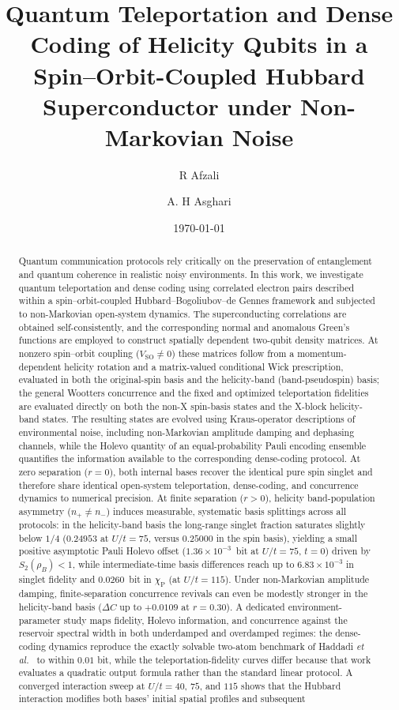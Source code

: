 \documentclass[aps,prb,twocolumn,superscriptaddress,longbibliography]{revtex4-2}
\begin{document}
\title{Quantum Teleportation and Dense Coding of Helicity Qubits in a Spin--Orbit-Coupled Hubbard Superconductor under Non-Markovian Noise}

\author{R Afzali}
\author{A. H Asghari}


\date{\today}

\begin{abstract}
Quantum communication protocols rely critically on the preservation of entanglement and quantum coherence in realistic noisy environments. In this work, we investigate quantum teleportation and dense coding using correlated electron pairs described within a spin--orbit-coupled Hubbard--Bogoliubov--de Gennes framework and subjected to non-Markovian open-system dynamics. The superconducting correlations are obtained self-consistently, and the corresponding normal and anomalous Green's functions are employed to construct spatially dependent two-qubit density matrices. At nonzero spin--orbit coupling ($V_{\mathrm{SO}}\neq0$) these matrices follow from a momentum-dependent helicity rotation and a matrix-valued conditional Wick prescription, evaluated in both the original-spin basis and the helicity-band (band-pseudospin) basis; the general Wootters concurrence and the fixed and optimized teleportation fidelities are evaluated directly on both the non-X spin-basis states and the X-block helicity-band states. The resulting states are evolved using Kraus-operator descriptions of environmental noise, including non-Markovian amplitude damping and dephasing channels, while the Holevo quantity of an equal-probability Pauli encoding ensemble quantifies the information available to the corresponding dense-coding protocol. At zero separation ($r=0$), both internal bases recover the identical pure spin singlet and therefore share identical open-system teleportation, dense-coding, and concurrence dynamics to numerical precision. At finite separation ($r>0$), helicity band-population asymmetry ($n_+\neq n_-$) induces measurable, systematic basis splittings across all protocols: in the helicity-band basis the long-range singlet fraction saturates slightly below $1/4$ ($0.24953$ at $U/t=75$, versus $0.25000$ in the spin basis), yielding a small positive asymptotic Pauli Holevo offset ($1.36\times 10^{-3}$~bit at $U/t=75$, $t=0$) driven by $S_2(\rho_B)<1$, while intermediate-time basis differences reach up to $6.83\times 10^{-3}$ in singlet fidelity and $0.0260$~bit in $\chi_{\mathrm{P}}$ (at $U/t=115$). Under non-Markovian amplitude damping, finite-separation concurrence revivals can even be modestly stronger in the helicity-band basis ($\Delta C$ up to $+0.0109$ at $r=0.30$). A dedicated environment-parameter study maps fidelity, Holevo information, and concurrence against the reservoir spectral width in both underdamped and overdamped regimes: the dense-coding dynamics reproduce the exactly solvable two-atom benchmark of Haddadi \emph{et al.}~\cite{Haddadi2023} to within $0.01$ bit, while the teleportation-fidelity curves differ because that work evaluates a quadratic output formula rather than the standard linear protocol. A converged interaction sweep at $U/t=40$, $75$, and $115$ shows that the Hubbard interaction modifies both bases' initial spatial profiles and subsequent 
\end{abstract}
\end{document}
